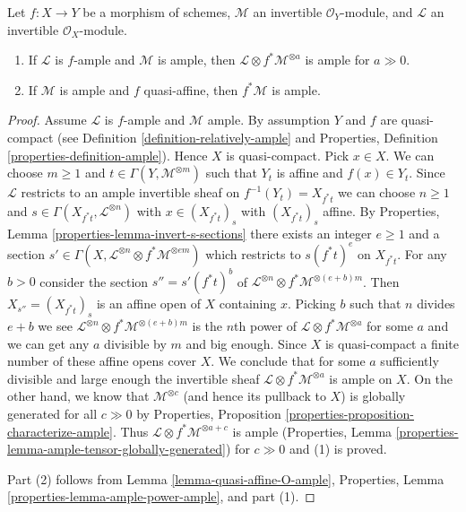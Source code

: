 \begin{lemma}
\label{lemma-pullback-ample-tensor-relatively-ample}
Let $f : X \to Y$ be a morphism of schemes, $\mathcal{M}$
an invertible $\mathcal{O}_Y$-module, and $\mathcal{L}$ an
invertible $\mathcal{O}_X$-module.
\begin{enumerate}
\item If $\mathcal{L}$ is $f$-ample and $\mathcal{M}$
is ample, then $\mathcal{L} \otimes f^*\mathcal{M}^{\otimes a}$ is ample
for $a \gg 0$.
\item If $\mathcal{M}$ is ample
and $f$ quasi-affine, then $f^*\mathcal{M}$ is ample.
\end{enumerate}
\end{lemma}

\begin{proof}
Assume $\mathcal{L}$ is $f$-ample and $\mathcal{M}$ ample.
By assumption $Y$ and $f$ are quasi-compact (see
Definition \ref{definition-relatively-ample} and
Properties, Definition \ref{properties-definition-ample}).
Hence $X$ is quasi-compact. Pick $x \in X$. We can choose $m \geq 1$
and $t \in \Gamma(Y, \mathcal{M}^{\otimes m})$ such that $Y_t$
is affine and $f(x) \in Y_t$. Since $\mathcal{L}$ restricts to an
ample invertible sheaf on $f^{-1}(Y_t) = X_{f^*t}$
we can choose $n \geq 1$ and $s \in \Gamma(X_{f^*t}, \mathcal{L}^{\otimes n})$
with $x \in (X_{f^*t})_s$ with $(X_{f^*t})_s$ affine.
By Properties, Lemma \ref{properties-lemma-invert-s-sections}
there exists an integer $e \geq 1$ and a section
$s' \in \Gamma(X, \mathcal{L}^{\otimes n} \otimes f^*\mathcal{M}^{\otimes em})$
which restricts to $s(f^*t)^e$ on $X_{f^*t}$. For any $b > 0$
consider the section $s'' = s'(f^*t)^b$ of
$\mathcal{L}^{\otimes n} \otimes f^*\mathcal{M}^{\otimes (e + b)m}$.
Then $X_{s''} = (X_{f^*t})_s$ is an affine open of $X$ containing $x$.
Picking $b$ such that $n$ divides $e + b$ we see
$\mathcal{L}^{\otimes n} \otimes f^*\mathcal{M}^{\otimes (e + b)m}$
is the $n$th power of $\mathcal{L} \otimes f^*\mathcal{M}^{\otimes a}$
for some $a$ and we can get any $a$ divisible by $m$ and big enough.
Since $X$ is quasi-compact a finite number of these affine opens
cover $X$. We conclude that for some $a$ sufficiently divisible and
large enough the invertible sheaf
$\mathcal{L} \otimes f^*\mathcal{M}^{\otimes a}$ is ample on $X$.
On the other hand, we know that $\mathcal{M}^{\otimes c}$
(and hence its pullback to $X$) is globally generated for all $c \gg 0$
by Properties, Proposition \ref{properties-proposition-characterize-ample}.
Thus $\mathcal{L} \otimes f^*\mathcal{M}^{\otimes a + c}$ is ample
(Properties, Lemma \ref{properties-lemma-ample-tensor-globally-generated})
for $c \gg 0$ and (1) is proved.

\medskip\noindent
Part (2) follows from Lemma \ref{lemma-quasi-affine-O-ample},
Properties, Lemma \ref{properties-lemma-ample-power-ample}, and
part (1).
\end{proof}

